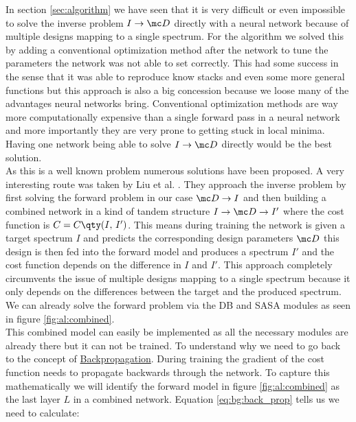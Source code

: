 In section \ref{sec:algorithm} we have seen that it is very difficult or even impossible to solve the inverse problem $I \rightarrow \mc D$ directly with a neural network because of multiple designs mapping to a single spectrum. For the algorithm we solved this by adding a conventional optimization method after the network to tune the parameters the network was not able to set correctly. This had some success in the sense that it was able to reproduce know stacks and even some more general functions  but this approach is also a big concession because we loose many of the advantages neural networks bring. Conventional optimization methods are way more computationally expensive than a single forward pass in a neural network and more importantly they are very prone to getting stuck in local minima. Having one network being able to solve $I \rightarrow \mc D$ directly would be the best solution.
\\

\indent As this is a well known problem numerous solutions have been proposed. A very interesting route was taken by Liu et al. \cite{Liu2018}. They approach the inverse problem by first solving the forward problem in our case $\mc D \rightarrow I$ and then building a combined network in a kind of tandem structure 
$I \rightarrow \mc D \rightarrow I'$
where the cost function is 
$C = C \qty(I, \, I')$.
This means during training the network is given a target spectrum $I$ and predicts the corresponding design parameters $\mc D$ this design is then fed into the forward model and produces a spectrum $I'$ and the cost function depends on the difference in $I$ and $I'$. This approach completely circumvents the issue of multiple designs mapping to a single spectrum because it only depends on the differences between the target and the produced spectrum. We can already solve the forward problem via the DB and SASA modules as seen in figure \ref{fig:al:combined}.
\\


\indent This combined model can easily be implemented as all the necessary modules are already there but it can not be trained. To understand why we need to go back to the concept of {\hyperref[eq:bg:back_prop]{Backpropagation}}.
During training the gradient of the cost function needs to propagate backwards through the network. To capture this mathematically we will identify the forward model in figure \ref{fig:al:combined} as the last layer $L$ in a combined network. Equation \eqref{eq:bg:back_prop} tells us we need to calculate:

